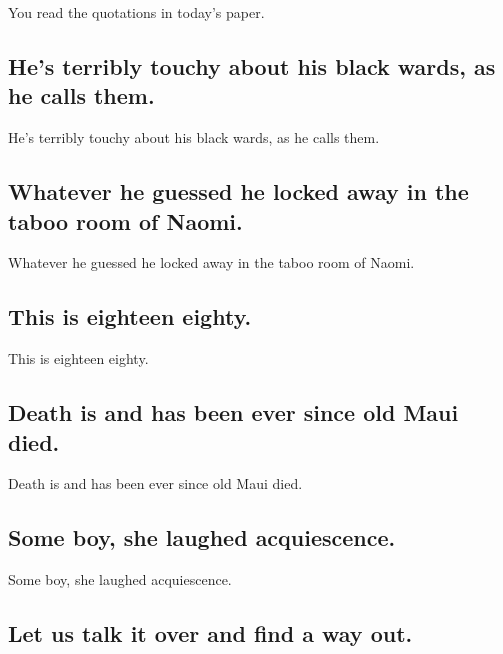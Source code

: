 \documentclass[]{article}
\begin{document}
You read the quotations in today's paper.

\hypertarget{hes-terribly-touchy-about-his-black-wards-as-he-calls-them.}{%
\subsection{He's terribly touchy about his black wards, as he calls
them.}\label{hes-terribly-touchy-about-his-black-wards-as-he-calls-them.}}

He's terribly touchy about his black wards, as he calls them.

\hypertarget{whatever-he-guessed-he-locked-away-in-the-taboo-room-of-naomi.}{%
\subsection{Whatever he guessed he locked away in the taboo room of
Naomi.}\label{whatever-he-guessed-he-locked-away-in-the-taboo-room-of-naomi.}}

Whatever he guessed he locked away in the taboo room of Naomi.

\hypertarget{this-is-eighteen-eighty.}{%
\subsection{This is eighteen eighty.}\label{this-is-eighteen-eighty.}}

This is eighteen eighty.

\hypertarget{death-is-and-has-been-ever-since-old-maui-died.}{%
\subsection{Death is and has been ever since old Maui
died.}\label{death-is-and-has-been-ever-since-old-maui-died.}}

Death is and has been ever since old Maui died.

\hypertarget{some-boy-she-laughed-acquiescence.}{%
\subsection{Some boy, she laughed
acquiescence.}\label{some-boy-she-laughed-acquiescence.}}

Some boy, she laughed acquiescence.

\hypertarget{let-us-talk-it-over-and-find-a-way-out.}{%
\subsection{Let us talk it over and find a way
out.}\label{let-us-talk-it-over-and-find-a-way-out.}}
\end{document}

